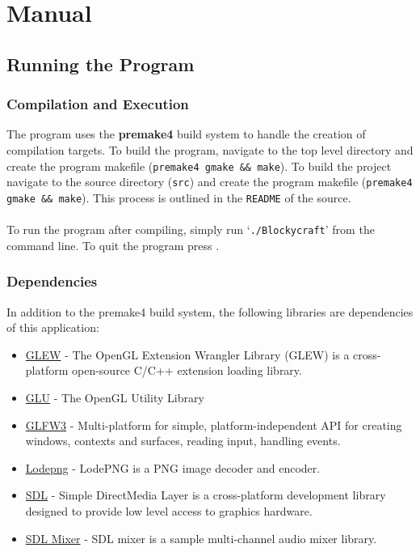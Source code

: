\documentclass{book}
\begin{document}

\chapter{Manual}
\section{Running the Program}
\subsection{Compilation and Execution}
The program uses the \textbf{premake4} build system to handle the creation of compilation targets.  To build the program, navigate to the top level directory and create the program makefile (\texttt{premake4 gmake \&\& make}).  To build the project navigate to the source directory (\texttt{src}) and create the program makefile (\texttt{premake4 gmake \&\& make}).
This process is outlined in the \texttt{README} of the source.
\\\\
To run the program after compiling, simply run `\texttt{./Blockycraft}' from the command line.  To quit the program press .

\subsection{Dependencies}
In addition to the premake4 build system, the following libraries are dependencies of this application: 
\begin{itemize}
	\item \href{https://github.com/nigels-com/glew}{GLEW} - The OpenGL Extension Wrangler Library (GLEW) is a cross-platform open-source C/C++ extension loading library.
	\item \href{https://www.opengl.org/resources/libraries/}{GLU} - The OpenGL Utility Library
	\item \href{http://www.glfw.org/docs/latest/}{GLFW3} - Multi-platform for simple, platform-independent API for creating windows, contexts and surfaces, reading input, handling events.
	\item \href{http://lodev.org/lodepng/}{Lodepng} - LodePNG is a PNG image decoder and encoder.
	\item \href{https://www.libsdl.org/}{SDL} - Simple DirectMedia Layer is a cross-platform development library designed to provide low level access to graphics hardware.
	\item \href{https://www.libsdl.org/projects/SDL_mixer/}{SDL Mixer} - SDL mixer is a sample multi-channel audio mixer library. 
\end{itemize}
\end{document}

